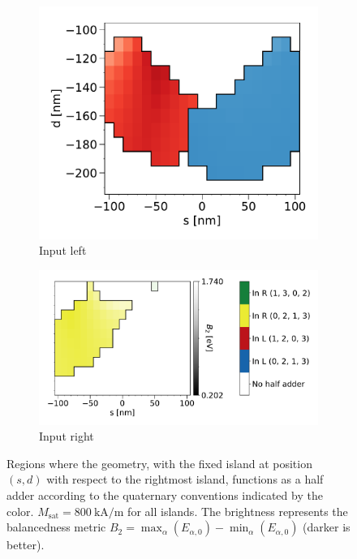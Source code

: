 \documentclass[11pt,a4paper,english,twoside]{article}
\begin{document}
\begin{figure}
    \centering
    \begin{subfigure}[t]{0.396\textwidth}
        \includegraphics[width=\textwidth]{Figures/half_adder/sweep/000006_d-s/table(d100-210_10,s-100-100_10)_balanced2_L.pdf}
        \caption{Input left}
    \label{fig:HalfAdder_000006_sweep_d-s_balanced2-L}
    \end{subfigure}
    \begin{subfigure}[t]{0.594\textwidth}
        \includegraphics[width=\textwidth]{Figures/half_adder/sweep/000006_d-s/table(d100-210_10,s-100-100_10)_balanced2_R.pdf}
        \caption{Input right}
    \label{fig:HalfAdder_000006_sweep_d-s_balanced2-R}
    \end{subfigure}
    \caption{Regions where the geometry, with the fixed island at position $(s, d)$ with respect to the rightmost island, functions as a half adder according to the quaternary conventions indicated by the color. $M_\mathrm{sat} = \SI{800}{\kilo\ampere\per\metre}$ for all islands. The brightness represents the balancedness metric $B_2 = \max_\alpha(E_{\alpha,0}) - \min_\alpha(E_{\alpha,0})$ (darker is better).}
    \label{fig:HalfAdder_000006_sweep_d-s_balanced2}
\end{figure}
\end{document}
